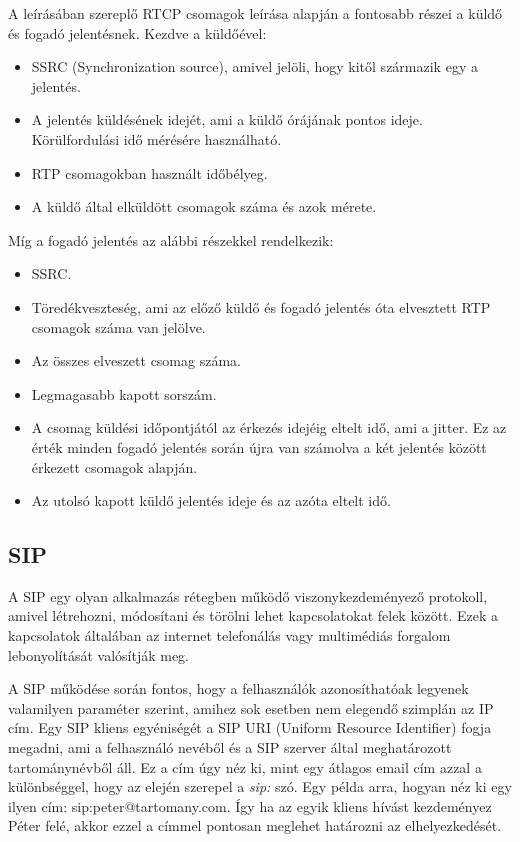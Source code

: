 A \cite{RFC3550} leírásában szereplő RTCP csomagok leírása alapján a fontosabb részei a
küldő és fogadó jelentésnek. Kezdve a küldőével: 

\begin{itemize}
	\item SSRC (Synchronization source), amivel jelöli, hogy kitől származik egy a jelentés.
	\item A jelentés küldésének idejét, ami a küldő órájának pontos ideje. Körülfordulási
	idő mérésére használható. 
	\item RTP csomagokban használt időbélyeg. 
	\item A küldő által elküldött csomagok száma és azok mérete.
\end{itemize}

Míg a fogadó jelentés az alábbi részekkel rendelkezik:

\begin{itemize}
	\item SSRC.
	\item Töredékveszteség, ami az előző küldő és fogadó jelentés óta elvesztett RTP csomagok
	száma van jelölve.
	\item Az összes elveszett csomag száma. 
	\item Legmagasabb kapott sorszám. 
	\item A csomag küldési időpontjától az érkezés idejéig eltelt idő, ami a jitter. Ez az érték
	minden fogadó jelentés során újra van számolva a két jelentés között érkezett csomagok 
	alapján.
	\item Az utolsó kapott küldő jelentés ideje és az azóta eltelt idő.  
\end{itemize}

\subsection{SIP}

A SIP egy olyan alkalmazás rétegben működő viszonykezdeményező protokoll, amivel 
létrehozni, módosítani és törölni lehet kapcsolatokat felek között. Ezek a kapcsolatok 
általában az internet telefonálás vagy multimédiás forgalom lebonyolítását valósítják meg. 

A SIP működése során fontos, hogy a felhasználók azonosíthatóak legyenek valamilyen
paraméter szerint, amihez sok esetben nem elegendő szimplán az IP cím. Egy 
SIP kliens egyéniségét a SIP URI (Uniform Resource Identifier) fogja megadni, ami
a  felhasználó nevéből és a SIP szerver által meghatározott tartománynévből áll.
Ez a cím úgy néz ki, mint egy átlagos email cím azzal a különbséggel, hogy az 
elején szerepel a \textit{sip:} szó. Egy példa arra, hogyan néz ki egy ilyen cím: 
sip:peter@tartomany.com. Így ha az egyik kliens hívást kezdeményez Péter felé,
akkor ezzel a címmel pontosan meglehet határozni az elhelyezkedését. 


